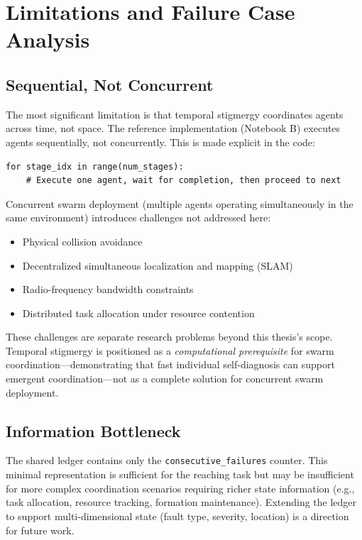 ﻿\documentclass[12pt,a4paper,oneside]{report}
\begin{document}
\section{Limitations and Failure Case Analysis}

\subsection{Sequential, Not Concurrent}

The most significant limitation is that temporal stigmergy coordinates agents across time, not space. The reference implementation (Notebook B) executes agents sequentially, not concurrently. This is made explicit in the code:

\begin{verbatim}
for stage_idx in range(num_stages):
    # Execute one agent, wait for completion, then proceed to next
\end{verbatim}

Concurrent swarm deployment (multiple agents operating simultaneously in the same environment) introduces challenges not addressed here:
\begin{itemize}
    \item Physical collision avoidance
    \item Decentralized simultaneous localization and mapping (SLAM)
    \item Radio-frequency bandwidth constraints
    \item Distributed task allocation under resource contention
\end{itemize}

These challenges are separate research problems beyond this thesis's scope. Temporal stigmergy is positioned as a \textit{computational prerequisite} for swarm coordination---demonstrating that fast individual self-diagnosis can support emergent coordination---not as a complete solution for concurrent swarm deployment.

\subsection{Information Bottleneck}

The shared ledger contains only the \texttt{consecutive\_failures} counter. This minimal representation is sufficient for the reaching task but may be insufficient for more complex coordination scenarios requiring richer state information (e.g., task allocation, resource tracking, formation maintenance). Extending the ledger to support multi-dimensional state (fault type, severity, location) is a direction for future work.
\end{document}
